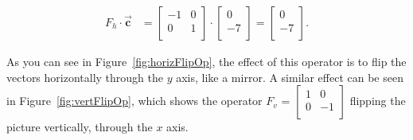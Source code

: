 \vspace{-.15in}
\begin{align*}
F_{h} \cdot \overrightarrow{\textbf{c}} &=
\begin{bmatrix}
-1 & 0 \\
0 & 1 \\
\end{bmatrix} \cdot
\begin{bmatrix}
0 \\ -7 \\
\end{bmatrix} =
\begin{bmatrix}
0 \\ -7 \\
\end{bmatrix}.
\end{align*}
\vspace{-.15in}


As you can see in Figure~\ref{fig:horizFlipOp}, the effect of this operator is
to flip the vectors horizontally through the $y$ axis, like a mirror. A similar
effect can be seen in Figure~\ref{fig:vertFlipOp}, which shows the operator
$F_v$ = {\scriptsize $\begin{bmatrix} 1 & 0 \\ 0 & -1 \\ \end{bmatrix}$}
flipping the picture vertically, through the $x$ axis.

